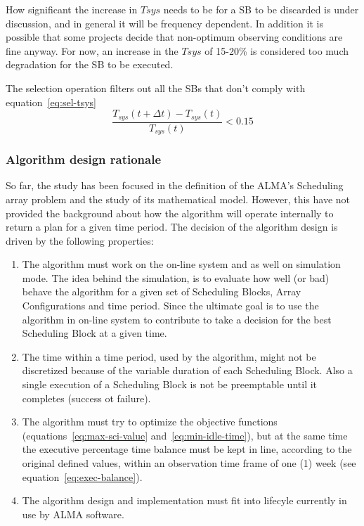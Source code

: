 \begin{description}
How significant the increase in $Tsys$ needs to be for a SB to be discarded
is under discussion, and in general it will be frequency dependent. In addition
it is possible that some projects decide that non-optimum observing conditions are
fine anyway. For now, an increase in the $Tsys$  of 15-20\% is considered too much
degradation for the SB to be executed.

The selection operation filters out all the SBs that don't comply with equation~\ref{eq:sel-tsys}
\begin{equation}
\label{eq:sel-tsys}
\frac{T_{sys}(t+\Delta t) - T_{sys}(t)}{T_{sys}(t)} < 0.15
\end{equation}

\end{description}

\subsubsection{Algorithm design rationale}

So far, the study has been focused in the definition of the ALMA's Scheduling array problem and the study of its mathematical model. However, this have not provided the background about how the algorithm will operate internally to return a plan for a given time period. The decision of the algorithm design is driven by the following properties:
\begin{enumerate}
\item The algorithm must work on the on-line system and as well on simulation mode. The idea behind the simulation, is to evaluate how well (or bad) behave the algorithm for a given set of Scheduling Blocks, Array Configurations and time period. Since the ultimate goal is to use the algorithm in on-line system to contribute to take a decision for the best Scheduling Block at a given time.

\item The time within a time period, used by the algorithm, might not be discretized because of the variable duration of each Scheduling Block. Also a single execution of a Scheduling Block is not be preemptable until it completes (success ot failure). 

\item The algorithm must try to optimize the objective functions (equations~\ref{eq:max-sci-value} and~\ref{eq:min-idle-time}), but at the same time the executive percentage time balance must be kept in line, according to the original defined values, within an observation time frame of one (1) week (see equation~\ref{eq:exec-balance}).

\item The algorithm design and implementation must fit into lifecyle currently in use by ALMA software.

\end{enumerate}

